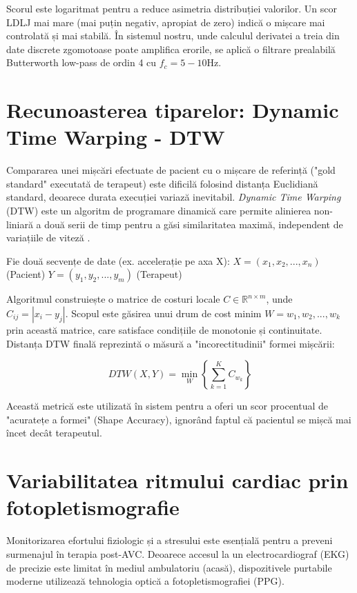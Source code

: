 Scorul este logaritmat pentru a reduce asimetria distribuției valorilor. Un scor LDLJ mai mare (mai puțin negativ, apropiat de zero) indică o mișcare mai controlată și mai stabilă. În sistemul nostru, unde calculul derivatei a treia din date discrete zgomotoase poate amplifica erorile, se aplică o filtrare prealabilă Butterworth low-pass de ordin 4 cu $f_c = 5-10 \text{Hz}$.

\section{Recunoasterea tiparelor: Dynamic Time Warping - DTW}
\hspace{0.75cm}Compararea unei mișcări efectuate de pacient cu o mișcare de referință ("gold standard" executată de terapeut) este dificilă folosind distanța Euclidiană standard, deoarece durata execuției variază inevitabil.
\textit{Dynamic Time Warping} (DTW) este un algoritm de programare dinamică care permite alinierea non-liniară a două serii de timp pentru a găsi similaritatea maximă, independent de variațiile de viteză \cite{sakoe_chiba_1978}.

Fie două secvențe de date (ex. accelerație pe axa X):
$X = (x_1, x_2, ..., x_n)$ (Pacient)
$Y = (y_1, y_2, ..., y_m)$ (Terapeut)

Algoritmul construiește o matrice de costuri locale $C \in \mathbb{R}^{n \times m}$, unde $C_{ij} = |x_i - y_j|$. Scopul este găsirea unui drum de cost minim $W = w_1, w_2, ..., w_k$ prin această matrice, care satisface condițiile de monotonie și continuitate. Distanța DTW finală reprezintă o măsură a "incorectitudinii" formei mișcării:

\begin{equation}
DTW(X, Y) = \min_{W} \left\{ \sum_{k=1}^{K} C_{w_k} \right\}
\end{equation}

Această metrică este utilizată în sistem pentru a oferi un scor procentual de "acuratețe a formei" (Shape Accuracy), ignorând faptul că pacientul se mișcă mai încet decât terapeutul.

\section{Variabilitatea ritmului cardiac prin fotopletismografie}
\hspace{0.75cm}Monitorizarea efortului fiziologic și a stresului este esențială pentru a preveni surmenajul în terapia post-AVC. 
Deoarece accesul la un electrocardiograf (EKG) de precizie este limitat în mediul ambulatoriu (acasă), dispozitivele purtabile moderne utilizează tehnologia optică a fotopletismografiei (PPG).

